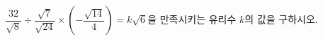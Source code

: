 $\dfrac{32}{\sqrt{8}}\div\dfrac{\sqrt{7}}{\sqrt{24}}\times\left(-\dfrac{\sqrt{14}}{4}\right)=k\sqrt{6}$을 만족시키는 유리수 $k$의 값을 구하시오.
